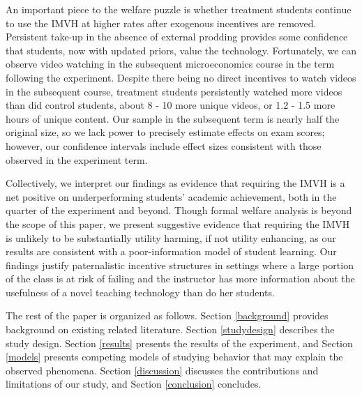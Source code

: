 \documentclass[12pt]{article}
\begin{document}
An important piece to the welfare puzzle is whether treatment students continue to use the IMVH at higher rates after exogenous incentives are removed. Persistent take-up in the absence of external prodding provides some confidence that students, now with updated priors, value the technology. Fortunately, we can observe video watching in the subsequent microeconomics course in the term following the experiment. Despite there being no direct incentives to watch videos in the subsequent course, treatment students persistently watched more videos than did control students, about 8 - 10 more unique videos, or 1.2 - 1.5 more hours of unique content. Our sample in the subsequent term is nearly half the original size, so we lack power to precisely estimate effects on exam scores; however, our confidence intervals include effect sizes consistent with those observed in the experiment term.

Collectively, we interpret our findings as evidence that requiring the IMVH is a net positive on underperforming students' academic achievement, both in the quarter of the experiment and beyond. Though formal welfare analysis is beyond the scope of this paper, we present suggestive evidence that requiring the IMVH is unlikely to be substantially utility harming, if not utility enhancing, as our results are consistent with a poor-information model of student learning. Our findings justify paternalistic incentive structures in settings where a large portion of the class is at risk of failing and the instructor has more information about the usefulness of a novel teaching technology than do her students.


The rest of the paper is organized as follows. Section \ref{background} provides background on existing related literature. Section \ref{studydesign} describes the study design. Section \ref{results} presents the results of the experiment, and Section \ref{models} presents competing models of studying behavior that may explain the observed phenomena. Section \ref{discussion} discusses the contributions and limitations of our study, and Section \ref{conclusion} concludes.
\end{document}

